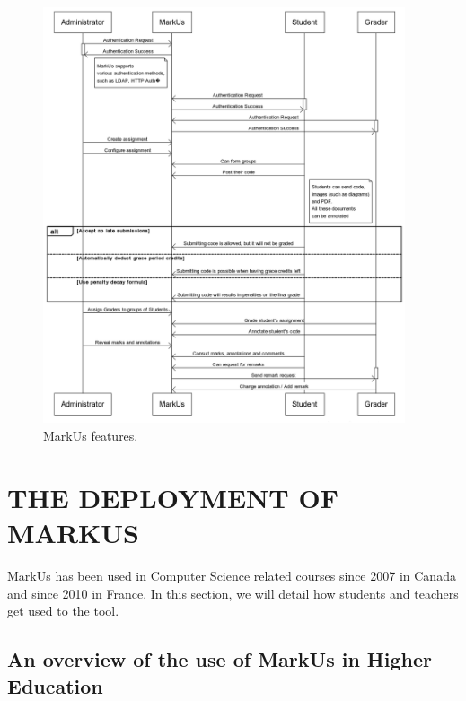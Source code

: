 \documentclass[twocolumn,10pt]{asme2e}
\begin{document}
\begin{figure}[htbp]
	\centering
		\includegraphics[width=0.95\textwidth]{Diagrams/diagram.png}
	\caption{MarkUs features.}
	\label{fig:features}
\end{figure}


\section*{THE DEPLOYMENT OF MARKUS}

MarkUs has been used in Computer Science related courses since 2007 in Canada and since 2010 in France. In this section, we will detail how students and teachers get used to the tool.

\subsection*{An overview of the use of MarkUs in Higher Education}
\end{document}
